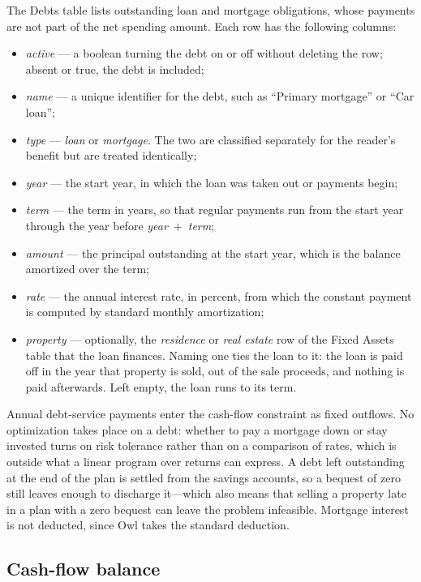 \documentclass[fleqn,12pt]{report}
\begin{document}
The Debts table lists outstanding loan and mortgage obligations, whose payments
are not part of the net spending amount.
Each row has the following columns:
\begin{itemize}[nosep]
  \item \textit{active} --- a boolean turning the debt on or off without deleting
    the row; absent or true, the debt is included;
  \item \textit{name} --- a unique identifier for the debt, such as
    ``Primary mortgage'' or ``Car loan'';
  \item \textit{type} --- \textit{loan} or \textit{mortgage}.  The two are
    classified separately for the reader's benefit but are treated identically;
  \item \textit{year} --- the start year, in which the loan was taken out or
    payments begin;
  \item \textit{term} --- the term in years, so that regular payments run from
    the start year through the year before \textit{year}~$+$~\textit{term};
  \item \textit{amount} --- the principal outstanding at the start year, which is
    the balance amortized over the term;
  \item \textit{rate} --- the annual interest rate, in percent, from which the
    constant payment is computed by standard monthly amortization;
  \item \textit{property} --- optionally, the \textit{residence} or
    \textit{real estate} row of the Fixed Assets table that the loan finances.
    Naming one ties the loan to it: the loan is paid off in the year that
    property is sold, out of the sale proceeds, and nothing is paid afterwards.
    Left empty, the loan runs to its term.
\end{itemize}

Annual debt-service payments enter the cash-flow constraint as fixed outflows.
No optimization takes place on a debt: whether to pay a mortgage down or stay
invested turns on risk tolerance rather than on a comparison of rates, which is
outside what a linear program over returns can express.
A debt left outstanding at the end of the plan is settled from the savings
accounts, so a bequest of zero still leaves enough to discharge it---which also
means that selling a property late in a plan with a zero bequest can leave the
problem infeasible.
Mortgage interest is not deducted, since Owl takes the standard deduction.

\subsection*{Cash-flow balance}
\end{document}
